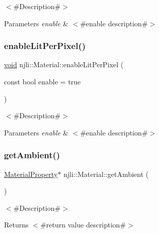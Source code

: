 $<$\#\+Description\#$>$


\begin{DoxyParams}{Parameters}
{\em enable} & $<$\#enable description\#$>$ \\
\hline
\end{DoxyParams}
\mbox{\label{classnjli_1_1_material_adeafc9c196919b3936e9a4cac979b8b5}} 
\subsubsection{\texorpdfstring{enable\+Lit\+Per\+Pixel()}{enableLitPerPixel()}}
{\footnotesize\ttfamily \mbox{\hyperlink{_thread_8h_af1e856da2e658414cb2456cb6f7ebc66}{void}} njli\+::\+Material\+::enable\+Lit\+Per\+Pixel (\begin{DoxyParamCaption}\item[{const bool}]{enable = {\ttfamily true} }\end{DoxyParamCaption})}

$<$\#\+Description\#$>$


\begin{DoxyParams}{Parameters}
{\em enable} & $<$\#enable description\#$>$ \\
\hline
\end{DoxyParams}
\mbox{\label{classnjli_1_1_material_aa29ca4337009ceae601d7e109585d70a}} 
\subsubsection{\texorpdfstring{get\+Ambient()}{getAmbient()}\hspace{0.1cm}{\footnotesize\ttfamily [1/2]}}
{\footnotesize\ttfamily \mbox{\hyperlink{classnjli_1_1_material_property}{Material\+Property}}$\ast$ njli\+::\+Material\+::get\+Ambient (\begin{DoxyParamCaption}{ }\end{DoxyParamCaption})}

$<$\#\+Description\#$>$

\begin{DoxyReturn}{Returns}
$<$\#return value description\#$>$ 
\end{DoxyReturn}
\mbox{\label{classnjli_1_1_material_a9997fe2226c7abff100c7059fbd6109f}} 
